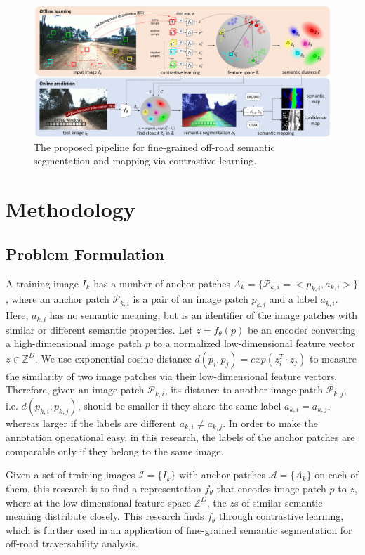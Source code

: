 \documentclass[letterpaper, 10 pt, conference]{ieeeconf}  %
\begin{document}
\begin{figure}[]
	\centering
	\includegraphics[width=\textwidth]{pipeline.pdf}
	\caption{The proposed pipeline for fine-grained off-road semantic segmentation and mapping via contrastive learning.}
	\label{fig:pipeline}
\end{figure}

\section{Methodology} \label{methodology}

\subsection{Problem Formulation}

A training image $I_k$ has a number of anchor patches $A_k=\{\mathcal{P}_{k,i}=<p_{k,i},a_{k,i}>\}$, where an anchor patch $\mathcal{P}_{k,i}$ is a pair of an image patch $p_{k,i}$ and a label $a_{k,i}$. Here, $a_{k,i}$ has no semantic meaning, but is an identifier of the image patches with similar or different semantic properties.
Let $z=f_{\theta}(p)$ be an encoder converting a high-dimensional image patch $p$ to a normalized low-dimensional feature vector $z\in \mathbb{Z}^D$. 
We use exponential cosine distance $d(p_i,p_j)=exp(z_i^T \cdot z_j)$ to measure the similarity of two image patches via their low-dimensional feature vectors.
Therefore, given an image patch $\mathcal{P}_{k,i}$, its distance to another image patch $\mathcal{P}_{k,j}$, i.e. $d(p_{k,i},p_{k,j})$, should be smaller if they share the same label $a_{k,i}=a_{k,j}$, whereas larger if the labels are different $a_{k,i} \neq a_{k,j}$.
In order to make the annotation operational easy, in this research, the labels of the anchor patches are comparable only if they belong to the same image.

Given a set of training images $\mathcal{I}=\{I_k\}$ with anchor patches $\mathcal{A}=\{A_k\}$ on each of them, this research is to find a representation $f_{\theta}$ that encodes image patch $p$ to $z$, where at the low-dimensional feature space $\mathbb{Z}^D$, the $z$s of similar semantic meaning distribute closely. 
This research finds $f_{\theta}$ through contrastive learning, which is further used in an application of fine-grained semantic segmentation for off-road traversability analysis.
\end{document}
